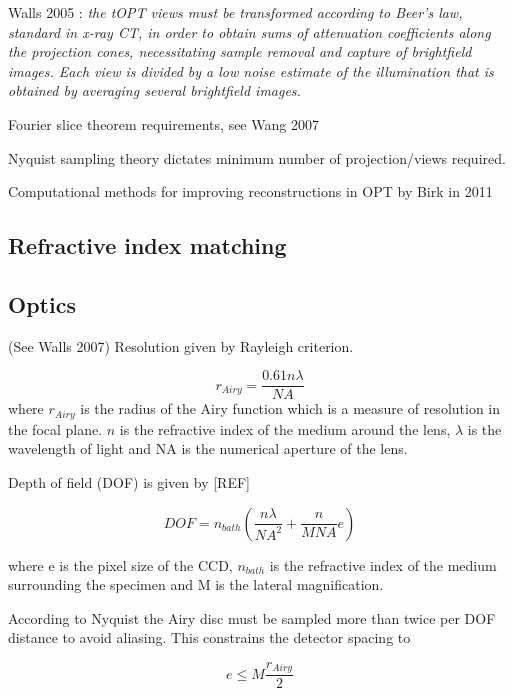 \documentclass[12pt]{article}
\begin{document}
Walls 2005 \cite{Walls:2005ja} : \textit{the tOPT views must be transformed according to Beer’s law, standard in x-ray CT, in order to obtain sums of attenuation coefficients along the projection cones, necessitating sample removal and capture of brightfield images. Each view is divided by a low noise estimate of the illumination that is obtained by averaging several brightfield images.}

Fourier slice theorem requirements, see Wang 2007 \cite{Wang:2007}

Nyquist sampling theory dictates minimum number of projection/views required.

Computational methods for improving reconstructions in OPT by Birk in 2011 \cite{Birk:2011}

\subsection{Refractive index matching}


\subsection{Optics}

(See Walls 2007) Resolution given by Rayleigh criterion.

\begin{equation}
r_{Airy} = \dfrac{0.61n\lambda}{NA}
\end{equation}
where $r_{Airy}$ is the radius of the Airy function which is a measure of resolution in the focal plane. $n$ is the refractive index of the medium around the lens, $\lambda$ is the wavelength of light and NA is the numerical aperture of the lens. 

Depth of field (DOF) is given by [REF]
 
\begin{equation}
DOF = n_{bath}(\dfrac{n\lambda}{NA^{2}} + \dfrac{n}{M NA}e)
\end{equation}

where e is the pixel size of the CCD, $n_{bath}$ is the refractive index of the medium surrounding the specimen and M is the lateral magnification.

According to Nyquist the Airy disc must be sampled more than twice per DOF distance to avoid aliasing. This constrains the detector spacing to

\begin{equation}
e \leq M \dfrac{r_{Airy}}{2}
\end{equation}
\end{document}
